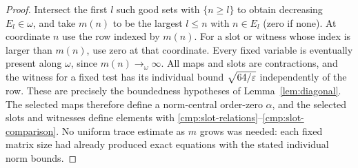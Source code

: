 \begin{proof}
Intersect the first $l$ such good sets with $\{n\ge l\}$ to obtain
decreasing $E_l\in\omega$, and take $m(n)$ to be the largest
$l\le n$ with $n\in E_l$ (zero if none).  At coordinate $n$ use
the row indexed by $m(n)$.  For a slot or witness whose index is
larger than $m(n)$, use zero at that coordinate.  Every fixed
variable is eventually present along $\omega$, since
$m(n)\to_\omega\infty$.  All maps and slots are contractions,
and the witness for a fixed test has its individual bound
$\sqrt{64/\varepsilon}$ independently of the row.  These are precisely
the boundedness hypotheses of Lemma~\ref{lem:diagonal}.
The selected maps therefore define a \cpc norm-central order-zero
$\alpha$, and the selected slots and witnesses define elements
with \eqref{cmp:slot-relations}--\eqref{cmp:slot-comparison}.
No uniform trace estimate as $m$ grows was needed: each fixed
matrix size had already produced exact equations with the stated
individual norm bounds.
\end{proof}
